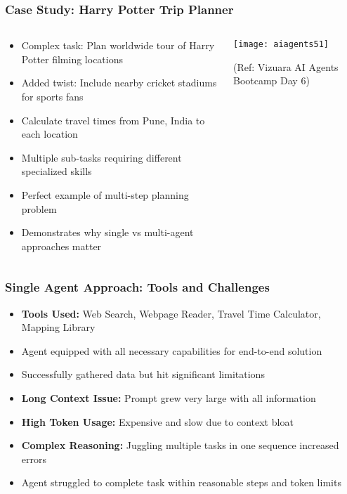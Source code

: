 \begin{frame}[fragile]\frametitle{Case Study: Harry Potter Trip Planner}
\begin{columns}
    \begin{column}[T]{0.6\linewidth}
      \begin{itemize}
		\item Complex task: Plan worldwide tour of Harry Potter filming locations
		\item Added twist: Include nearby cricket stadiums for sports fans
		\item Calculate travel times from Pune, India to each location
		\item Multiple sub-tasks requiring different specialized skills
		\item Perfect example of multi-step planning problem
		\item Demonstrates why single vs multi-agent approaches matter
	  \end{itemize}
    \end{column}
    \begin{column}[T]{0.4\linewidth}
		\begin{center}
		\texttt{[image: aiagents51]}
		
		{\tiny (Ref: Vizuara AI Agents Bootcamp Day 6)}
		\end{center}	
    \end{column}
  \end{columns}
\end{frame}

\begin{frame}[fragile]\frametitle{Single Agent Approach: Tools and Challenges}

      \begin{itemize}
		\item \textbf{Tools Used:} Web Search, Webpage Reader, Travel Time Calculator, Mapping Library
		\item Agent equipped with all necessary capabilities for end-to-end solution
		\item Successfully gathered data but hit significant limitations
		\item \textbf{Long Context Issue:} Prompt grew very large with all information
		\item \textbf{High Token Usage:} Expensive and slow due to context bloat
		\item \textbf{Complex Reasoning:} Juggling multiple tasks in one sequence increased errors
		\item Agent struggled to complete task within reasonable steps and token limits
	  \end{itemize}


\end{frame}

